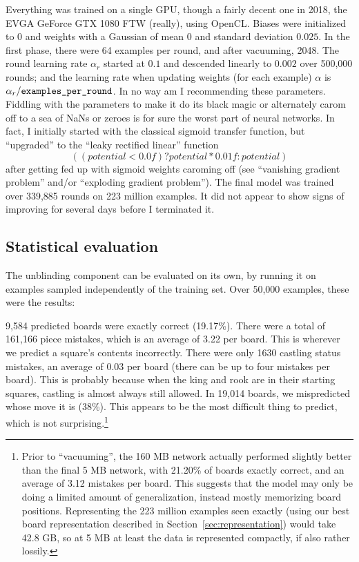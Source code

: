 \documentclass[twocolumn]{amsart}
\begin{document}
Everything was trained on a single GPU, though a fairly decent one in
2018, the EVGA GeForce GTX 1080 FTW (really), using OpenCL. Biases
were initialized to $0$ and weights with a Gaussian of mean $0$ and
standard deviation $0.025$. In the first phase, there were 64 examples
per round, and after vacuuming, 2048. The round learning rate
$\alpha_r$ started at $0.1$ and descended linearly to $0.002$ over
500,000 rounds; and the learning rate when updating weights (for each
example) $\alpha$ is $\alpha_r / \verb+examples_per_round+$. In no way
am I recommending these parameters. Fiddling with the parameters to
make it do its black magic or alternately carom off to a sea of NaNs
or zeroes is for sure the worst part of neural networks. In fact, I
initially started with the classical sigmoid transfer function, but
``upgraded'' to the ``leaky rectified linear'' function
%
$$((potential < 0.0f) ? potential * 0.01f : potential)$$
%
after getting fed up with sigmoid weights caroming off (see
``vanishing gradient problem'' and/or ``exploding gradient problem'').
The final model was trained over 339,885 rounds on 223 million
examples. It did not appear to show signs of improving for
several days before I terminated it.

\subsection{Statistical evaluation}

The unblinding component can be evaluated on its own, by running
it on examples sampled independently of the training set. Over
50,000 examples, these were the results:

9,584 predicted boards were exactly correct (19.17\%). There were a
total of 161,166 piece mistakes, which is an average of 3.22 per
board. This is wherever we predict a square's contents incorrectly.
There were only 1630 castling status mistakes, an average of 0.03 per
board (there can be up to four mistakes per board). This is probably
because when the king and rook are in their starting squares, castling
is almost always still allowed. In 19,014 boards, we mispredicted
whose move it is (38\%). This appears to be the most difficult thing
to predict, which is not surprising.\footnote{ Prior to ``vacuuming'',
  the 160 MB network actually performed slightly better than the final
  5 MB network, with 21.20\% of boards exactly correct, and an average
  of 3.12 mistakes per board. This suggests that the model may only be
  doing a limited amount of generalization, instead mostly memorizing
  board positions. Representing the 223 million examples seen exactly
  (using our best board representation described in
  Section~\ref{sec:representation}) would take 42.8 GB, so at 5 MB at
  least the data is represented compactly, if also rather lossily.}
\end{document}
